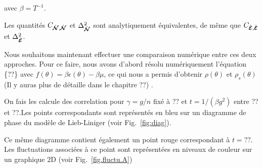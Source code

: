 avec \( \beta =T^{-1} \).

Les quantités \( C_{\hat{\bm{\mathcal{N}}},\hat{\bm{\mathcal{N}}}} \) et \( \Delta_{\hat{\bm{\mathcal{N}}}}^2 \) sont analytiquement équivalentes, de même que \( C_{\hat{\bm{\mathcal{E}}},\hat{\bm{\mathcal{E}}}} \) et \( \Delta_{\hat{\bm{\mathcal{E}}}}^2 \).

Nous souhaitons maintenant effectuer une comparaison numérique entre ces deux approches. Pour ce faire, nous avons d'abord résolu numériquement l’équation \{??\} avec \( f(\theta) = \beta \epsilon(\theta) - \beta\mu \), ce qui nous a permis d’obtenir \( \rho(\theta) \) et \( \rho_s(\theta) \) (Il y auras plus de détaille dans le chapitre ??) .


On fais les calcule des correlation pour $\gamma = g/n $ fixé à ?? et $t = 1/(\beta g^2)$ entre ?? et ??.Les points correspondants sont représentés en bleu sur un diagramme de phase du modèle de Lieb-Liniger (voir Fig.~\ref{fig:diag}).


Ce même diagramme contient également un point rouge correspondant à \( t = ?? \). Les fluctuations associées à ce point sont représentées en niveaux de couleur sur un graphique 2D (voir Fig.~\ref{fig.fluctu.A})

